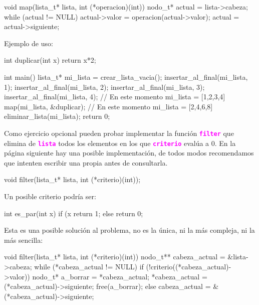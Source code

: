\documentclass[]{scrartcl}
\newcommand{\hl}[1]{\textcolor{magenta}{\textbf{\texttt{#1}}}}
\begin{document}
\newpage %

\begin{cbox}[unbreakable]{}
void map(lista_t* lista, int (*operacion)(int)) {
    nodo_t* actual = lista->cabeza;
    while (actual != NULL) {
        actual->valor = operacion(actual->valor);
        actual = actual->siguiente;
    }
}
\end{cbox}

Ejemplo de uso:

\begin{cbox}[unbreakable]{}
int duplicar(int x) {
    return x*2;
}

int main() {
    lista_t* mi_lista = crear_lista_vacia();
    insertar_al_final(mi_lista, 1);
    insertar_al_final(mi_lista, 2);
    insertar_al_final(mi_lista, 3);
    insertar_al_final(mi_lista, 4);
    // En este momento mi_lista = [1,2,3,4]
    map(mi_lista, &duplicar);
    // En este momento mi_lista = [2,4,6,8]
    eliminar_lista(mi_lista);
    return 0;
}
\end{cbox}

Como ejercicio opcional pueden probar implementar la función \hl{filter} que elimina de \hl{lista} todos los elementos en los que \hl{criterio} evalúa a 0. En la página siguiente hay una posible implementación, de todos modos recomendamos que intenten escribir una propia antes de consultarla.
\begin{bashbox}[minted language=C]
void filter(lista_t* lista, int (*criterio)(int));
\end{bashbox}

Un posible criterio podría ser:
\begin{cbox}[unbreakable]{}
int es_par(int x) {
    if (x %
        return 1;
    else
        return 0;
}
\end{cbox}

\newpage

Esta es una posible solución al problema, no es la única, ni la más compleja, ni la más sencilla:

\begin{cbox}[unbreakable]{}
void filter(lista_t* lista, int (*criterio)(int)) {
    nodo_t** cabeza_actual = &lista->cabeza;
    while (*cabeza_actual != NULL) {
        if (!criterio((*cabeza_actual)->valor)) {
            nodo_t* a_borrar = *cabeza_actual;
            *cabeza_actual = (*cabeza_actual)->siguiente;
            free(a_borrar);
        } else {
            cabeza_actual = &(*cabeza_actual)->siguiente;
        }
    }
}
\end{cbox}
\end{document}
